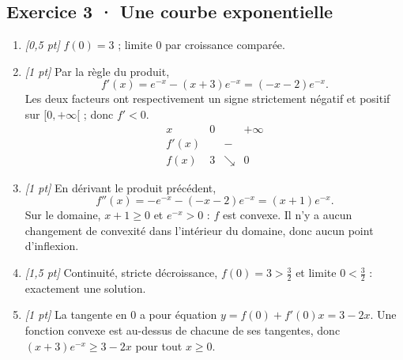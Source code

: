 \subsection*{Exercice 3 · Une courbe exponentielle}\begin{enumerate}

\item \textit{[0,5 pt]} $f(0)=3$ ; limite $0$ par croissance comparée.

\item \textit{[1 pt]} Par la règle du produit,
\[f'(x)=e^{-x}-(x+3)e^{-x}=(-x-2)e^{-x}.\]
Les deux facteurs ont respectivement un signe strictement négatif et positif sur $[0,+\infty[$ ; donc $f'<0$.
\[\begin{array}{c|ccc}x&0&&+\infty\\\hline f'(x)&&-&\\\hline f(x)&3&\searrow&0\end{array}\]

\item \textit{[1 pt]} En dérivant le produit précédent,
\[f''(x)=-e^{-x}-(-x-2)e^{-x}=(x+1)e^{-x}.\]
Sur le domaine, $x+1\ge0$ et $e^{-x}>0$ : $f$ est convexe. Il n'y a aucun changement de convexité dans l'intérieur du domaine, donc aucun point d'inflexion.

\item \textit{[1,5 pt]} Continuité, stricte décroissance, $f(0)=3>\frac{3}{2}$ et limite $0<\frac{3}{2}$ : exactement une solution.

\item \textit{[1 pt]} La tangente en $0$ a pour équation $y=f(0)+f'(0)x=3-2x$. Une fonction convexe est au-dessus de chacune de ses tangentes, donc $(x+3)e^{-x}\ge 3-2x$ pour tout $x\ge0$.

\end{enumerate}

